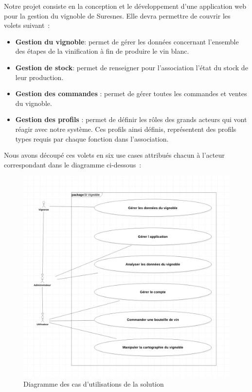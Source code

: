 \documentclass[a4paper, titlepage]{report}
\begin{document}
Notre projet consiste en la conception et le développement d'une
application web pour la gestion du vignoble de Suresnes. Elle devra permettre de couvrir les volets suivant~: 
\begin{itemize}
\item \textbf{Gestion du vignoble}: permet de gérer les données concernant l'ensemble des étapes
de la vinification à fin de produire le vin blanc.
\item \textbf{Gestion de stock}:
permet de renseigner pour l'association l'état du stock de leur
production.
\item \textbf{Gestion des commandes} : permet de gérer toutes les
commandes et ventes du vignoble.
\item \textbf{Gestion des profils} : permet de
définir les rôles des grands acteurs qui vont réagir avec
notre système. Ces profils ainsi définis, représentent des profils types
requis par chaque fonction dans l'association.
\end{itemize}

Nous avons découpé ces volets en six use cases attribués chacun à l'acteur correspondant dans le diagramme ci-dessous~:

\begin{figure}[!h]
\centering
\includegraphics{Images/UseCaseDiagramSolution.png}
\caption{Diagramme des cas d'utilisations de la solution}
\end{figure}
\end{document}
